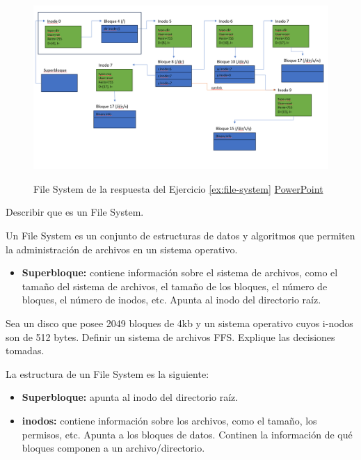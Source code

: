 \documentclass[../main.tex]{subfiles}
\begin{document}
    \begin{figure}[ht]
        \centering
        \includegraphics[scale=0.3]{../images/file-system.png}
        \label{fig:file-system}
        \caption{File System de la respuesta del Ejercicio \ref{ex:file-system} \href{https://fiubaar-my.sharepoint.com/:p:/g/personal/lcondoriz_fi_uba_ar/ERIlPc9eeJNOg9fCVzz2cjgBsjhy15nYJswfVTfWUNNcTg?e=KJvO2T}{PowerPoint}}
    \end{figure}

    \begin{exercise}
        Describir que es un File System.
        \begin{answer}
            Un File System es un conjunto de estructuras de datos y algoritmos que permiten la administración de archivos en un sistema operativo.
            \begin{itemize}
                \item \textbf{Superbloque:} contiene información sobre el sistema de archivos, como el tamaño del sistema de archivos, el tamaño de los bloques, el número de bloques, el número de inodos, etc. Apunta al inodo del directorio raíz.
            \end{itemize}
        \end{answer}
    \end{exercise}

    \begin{exercise}
        Sea un disco que posee 2049 bloques de 4kb y un sistema operativo cuyos i-nodos son de 512 bytes. Definir un sistema de archivos FFS. Explique las decisiones tomadas.

        \begin{answer}
            La estructura de un File System es la siguiente:
            \begin{itemize}
                \item \textbf{Superbloque:} apunta al inodo del directorio raíz.
                \item \textbf{inodos:} contiene información sobre los archivos, como el tamaño, los permisos, etc. Apunta a los bloques de datos. Continen la información de qué bloques componen a un archivo/directorio.
            \end{itemize}
        \end{answer}
    \end{exercise}
\end{document}
